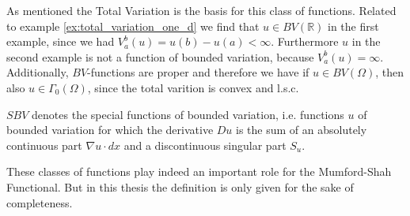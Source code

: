     As mentioned the Total Variation is the basis for this class of functions. Related to example \ref{ex:total_variation_one_d} we find that $u \in BV(\mathbb{R})$ in the first example, since we had $V^{b}_{a}(u) = u(b) - u(a) < \infty$. Furthermore $u$ in the second example is not a function of bounded variation, because $V^{b}_{a}(u) = \infty$.\\
    Additionally, $BV$-functions are proper and therefore we have if $u \in BV(\Omega)$, then also $u \in \Gamma_{0}(\Omega)$, since the total varition is convex and l.s.c.

    \begin{definition}
        $SBV$ denotes the special functions of bounded variation, i.e. functions $u$ of bounded variation for which the derivative $Du$ is the sum of an absolutely continuous part $\nabla u \cdot dx$ and a discontinuous singular part $S_{u}$.
    \end{definition}

    These classes of functions play indeed an important role for the Mumford-Shah Functional. But in this thesis the definition is only given for the sake of completeness.

